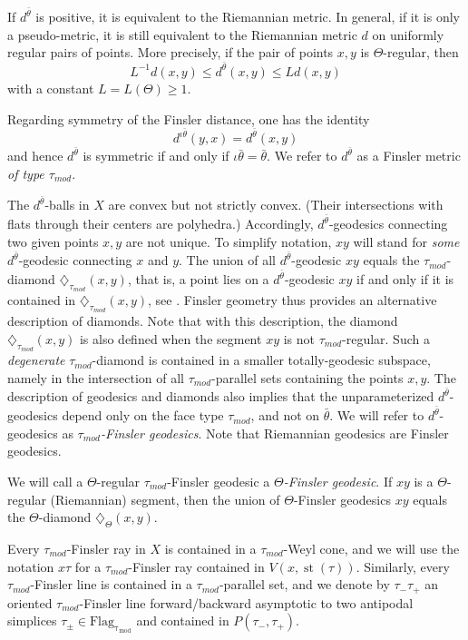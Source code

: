 \documentclass[12pt]{article}
\theoremstyle{boldplain}
\theoremstyle{bolddefinition}
\numberwithin{equation}{section}
\def\diamot{\diamondsuit_{\tau_{mod}}}
\def\diamoTh{\diamondsuit_{\Theta}}
\def\Flagt{\operatorname{Flag_{\tau_{mod}}}}
\def\st{\operatorname{st}}
\def\taumod{\tau_{mod}}
\begin{document}
If $d^{\bar\theta}$ is positive,
it is equivalent to the Riemannian metric. 
In general, if it is only a pseudo-metric,
it is still equivalent to the Riemannian metric $d$ on uniformly regular pairs of points.
More precisely,
if the pair of points $x,y$ is $\Theta$-regular, then 
$$
L^{-1} d(x,y) \le d^{\bar\theta}(x,y)\le L d(x,y)
$$ 
with a constant $L=L(\Theta)\ge  1$.

Regarding symmetry of the Finsler distance, one has the identity
\begin{equation*}
d^{\iota\bar\theta}(y,x)  = d^{\bar\theta}(x,y)
\end{equation*}
and hence $d^{\bar\theta}$ is symmetric if and only if 
$\iota\bar\theta=\bar\theta$.
We refer to $d^{\bar\theta}$ as a Finsler metric {\em of type $\taumod$}.


The $d^{\bar\theta}$-balls in $X$ are convex but not strictly convex.
(Their intersections with flats through their centers are polyhedra.)
Accordingly,
$d^{\bar\theta}$-geodesics connecting two given points $x,y$ are not unique. 
To simplify notation,
$xy$ will stand for {\em some} $d^{\bar\theta}$-geodesic connecting $x$ and $y$.
The union of all $d^{\bar\theta}$-geodesic $xy$ equals the $\taumod$-diamond $\diamot(x,y)$,
that is, a point lies on a $d^{\bar\theta}$-geodesic $xy$ if and only if it is contained in $\diamot(x,y)$, see \cite{anolec}.
Finsler geometry thus provides an alternative description of diamonds.  
Note that with this description, 
the diamond $\diamot(x,y)$ is also defined when the segment $xy$ is not $\taumod$-regular. 
Such a {\em degenerate} $\taumod$-diamond is contained in a smaller totally-geodesic subspace,
namely in the intersection of all $\taumod$-parallel sets containing the points $x,y$.
The description of geodesics and diamonds 
also implies that the unparameterized $d^{\bar\theta}$-geodesics depend only on the face type $\taumod$,
and not on $\bar\theta$.
We will refer to $d^{\bar\theta}$-geodesics as {\em $\taumod$-Finsler geodesics}.
Note that Riemannian geodesics are Finsler geodesics.

We will call a $\Theta$-regular $\taumod$-Finsler geodesic a {\em $\Theta$-Finsler geodesic}.
If $xy$ is a $\Theta$-regular (Riemannian) segment,
then the union of $\Theta$-Finsler geodesics $xy$ equals the $\Theta$-diamond $\diamoTh(x,y)$. 

Every $\taumod$-Finsler ray in $X$ is contained in a $\taumod$-Weyl cone,
and we will use the notation $x\tau$ for a $\taumod$-Finsler ray contained {in} $V(x,\st(\tau))$.
Similarly, 
every $\taumod$-Finsler line is contained in a $\taumod$-parallel set,
and we denote by $\tau_-\tau_+$ an oriented $\taumod$-Finsler line 
forward/backward asymptotic to two antipodal simplices $\tau_{\pm}\in\Flagt$ 
and contained in $P(\tau_-,\tau_+)$. 
\end{document}
